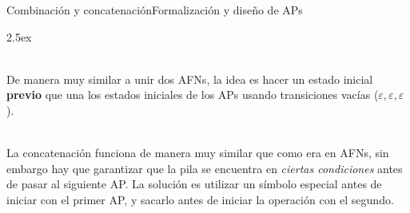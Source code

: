 \documentclass[spanish]{beamer}
\begin{document}
\begin{frame}{Combinación y concatenación}{Formalización y diseño de APs}
    \begin{description}
        \itemsep2.5ex
        \item[Combinación de APs] \hfill \\
        De manera muy similar a unir dos AFNs, la idea es hacer un estado inicial \textbf{previo} que una los estados iniciales de los APs usando transiciones vacías ($\varepsilon,\varepsilon,\varepsilon$). \pause
        \item[Concatenación de APs]  \hfill \\
        La concatenación funciona de manera muy similar que como era en AFNs, sin embargo hay que garantizar que la pila se encuentra en \textit{ciertas condiciones} antes de pasar al siguiente AP.
        La solución es utilizar un símbolo especial antes de iniciar con el primer AP, y sacarlo antes de iniciar la operación con el segundo.
    \end{description}
    
\end{frame}

% 
% 
\end{document}
